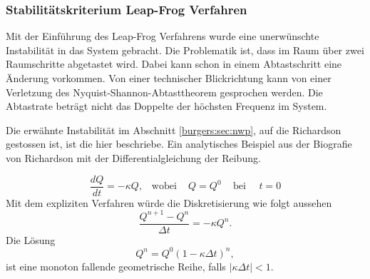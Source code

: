 \subsubsection{Stabilit\"atskriterium Leap-Frog Verfahren}
	Mit der Einf\"uhrung des Leap-Frog Verfahrens wurde eine unerw\"unschte Instabilit\"at in das System gebracht.
	Die Problematik ist, dass im Raum über zwei Raumschritte abgetastet wird.
	Dabei kann schon in einem Abtastschritt eine Änderung vorkommen.
	Von einer technischer Blickrichtung kann von einer Verletzung des Nyquist-Shannon-Abtasttheorem gesprochen werden.
	Die Abtastrate beträgt nicht das Doppelte der höchsten Frequenz im System.

	\medskip

	Die erw\"ahnte Instabilit\"at im Abschnitt \ref{burgers:sec:nwp}, auf die Richardson gestossen ist, ist die hier beschriebe.
	Ein analytisches Beispiel aus der Biografie von Richardson \cite{burgers:lynch_2014} mit der Differentialgleichung der Reibung.

	\begin{equation}
		\frac{dQ}{dt} = - \kappa Q, \,\,\,\,\, \text{wobei} \, \,\,\,\,\,\, Q=Q^0 \,\,\,\,\,\,\, \text{bei} \,\,\,\,\,\,\,\, t=0
	\end{equation}
	Mit dem expliziten Verfahren w\"urde die Diskretisierung wie folgt aussehen
	\begin{equation}
		\frac{Q^{n+1}-Q^n}{\Delta t} = - \kappa Q^n.
	\end{equation}
	Die L\"osung
		\begin{equation}
			Q^n = Q^0(1-\kappa \Delta t)^n,
		\end{equation}
	ist eine monoton fallende geometrische Reihe, falls $|\kappa \Delta t| <1$.

